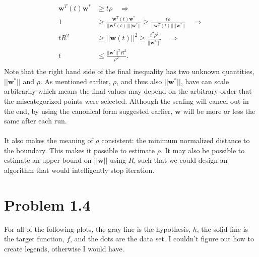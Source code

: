 \documentclass[11pt,letterpaper]{article}
\newcommand{\vv}[1]{\mathbf{#1}} %
\begin{document}
\begin{align*}
    \vv{w}^T(t)\vv{w}^* &\ge t\rho \quad \Longrightarrow \\
    1 &\ge \frac{\vv{w}^T(t)\vv{w}^*}{||\vv{w}^T(t)|| ||\vv{w}^*||} \ge \frac{t\rho}{||\vv{w}^T(t)|| ||\vv{w}^*||} \quad \Longrightarrow \\
    tR^2 &\ge ||\vv{w}(t)||^2 \ge \frac{t^2 \rho^2}{||\vv{w}^*||^2} \quad \Longrightarrow \\
    t &\le \frac{||\vv{w}^*||^2R^2}{\rho^2}. \\
\end{align*}
Note that the right hand side of the final inequality has two unknown quantities, $||\vv{w}^*||$ and $\rho$.  As mentioned earlier, $\rho$, and thus also $||\vv{w}^*||$, have can scale arbitrarily which means the final values may depend on the arbitrary order that the miscategorized points were selected.  Although the scaling will cancel out in the end, by using the canonical form suggested earlier, $\vv{w}$ will be more or less the same after each run.
\\\\
It also makes the meaning of $\rho$ consistent: the minimum normalized distance to the boundary.  This makes it possible to estimate $\rho$.  It may also be possible to estimate an upper bound on $||\vv{w}||$ using $R$, such that we could design an algorithm that would intelligently stop iteration.

\section*{Problem 1.4}
For all of the following plots, the gray line is the hypothesis, $h$, the solid line is the target function, $f$, and the dots are the data set.  I couldn't figure out how to create legends, otherwise I would have.
\end{document}
